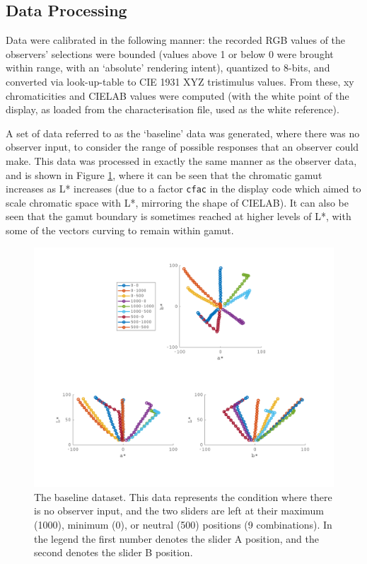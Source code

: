 
\subsection{Data Processing}

Data were calibrated in the following manner: the recorded RGB values of the observers' selections were bounded (values above 1 or below 0 were brought within range, with an `absolute' rendering intent), quantized to 8-bits, and converted via look-up-table to \gls{CIE} 1931 XYZ tristimulus values. From these, xy chromaticities and CIELAB values were computed (with the white point of the display, as loaded from the characterisation file, used as the white reference).

A set of data referred to as the `baseline' data was generated, where there was no observer input, to consider the range of possible responses that an observer could make. This data was processed in exactly the same manner as the observer data, and is shown in Figure \ref{fig:overviewBL}, where it can be seen that the chromatic gamut increases as L* increases (due to a factor \texttt{cfac} in the display code which aimed to scale chromatic space with L*, mirroring the shape of CIELAB). It can also be seen that the gamut boundary is sometimes reached at higher levels of L*, with some of the vectors curving to remain within gamut.

\begin{figure}[htbp]
\includegraphics[max width=1.2\textwidth, center]{figs/LargeSphere/baselinedataOverview.pdf}
\caption{The baseline dataset. This data represents the condition where there is no observer input, and the two sliders are left at their maximum (1000), minimum (0), or neutral (500) positions (9 combinations). In the legend the first number denotes the slider A position, and the second denotes the slider B position.}
\label{fig:overviewBL}
\end{figure}

